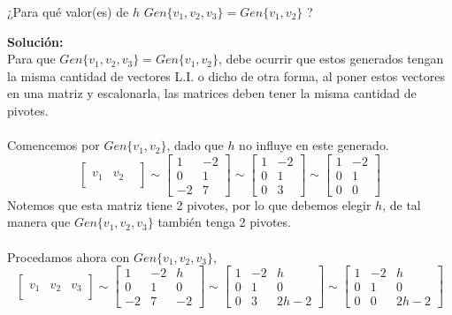 \documentclass[12pt]{article}
\newenvironment{solucion}
{\begin{mdframed}[backgroundcolor=black!10]
		{\bf Solución:}\\
	}
	{
	\end{mdframed}
}
\newenvironment{preguntas}
{\begin{enumerate}\itemsep12pt
	}
	{
	\end{enumerate}
}
\begin{document}
\begin{preguntas}
¿Para qué valor(es) de $h$ $Gen\{v_1, v_2, v_3\}=Gen\{v_1,v_2\}$ ?
\begin{solucion}
Para que $Gen\{v_1, v_2, v_3\}=Gen\{v_1,v_2\}$, debe ocurrir que estos generados tengan la misma cantidad de vectores L.I. o dicho de otra forma, al poner estos vectores en una matriz y escalonarla, las matrices deben tener la misma cantidad de pivotes.\\
	\\
	Comencemos por $Gen\{v_1,v_2\}$, dado que $h$ no influye en este generado.
	$$\begin{bmatrix}
	\\
	v_1 & v_2\\
	&&
	\end{bmatrix} \sim 
	\begin{bmatrix}
	1 & -2\\
	0 & 1\\
	-2 & 7
	\end{bmatrix} \sim 
	\begin{bmatrix}
	1 & -2\\
	0 & 1\\
	0 & 3
	\end{bmatrix} \sim 
	\begin{bmatrix}
	1 & -2\\
	0 & 1\\
	0 & 0
	\end{bmatrix}$$
	Notemos que esta matriz tiene 2 pivotes, por lo que debemos elegir $h$, de tal manera que $Gen\{v_1, v_2, v_3\}$ también tenga 2 pivotes.\\
	\\
	Procedamos ahora con $Gen\{v_1, v_2, v_3\}$,
	$$\begin{bmatrix}
	\\
	v_1 & v_2 & v_3\\
	&&
	\end{bmatrix} \sim 
	\begin{bmatrix}
	1 & -2 & h\\
	0 & 1 & 0\\
	-2 & 7 & -2
	\end{bmatrix} \sim 
	\begin{bmatrix}
	1 & -2 & h\\
	0 & 1 & 0\\
	0 & 3 & 2h-2
	\end{bmatrix} \sim 
	\begin{bmatrix}
	1 & -2 & h\\
	0 & 1 & 0\\
	0 & 0 & 2h-2
	\end{bmatrix}$$

\end{solucion}
\end{preguntas}
\end{document}

